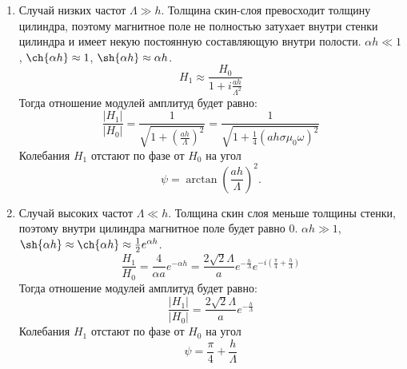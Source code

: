 \begin{enumerate}
	\item Случай низких частот $\Lambda \gg h$. Толщина скин-слоя превосходит толщину цилиндра, поэтому магнитное поле не полностью затухает внутри стенки цилиндра и имеет некую постоянную составляющую внутри полости. $\alpha h \ll 1$, $\ch{\alpha h} \approx 1$, $\sh{\alpha h} \approx \alpha h$.
	$$
	H_1 \approx \frac{H_0}{1 + i \frac{ah}{\Lambda^2}}
	$$
	Тогда отношение модулей амплитуд будет равно:
	\begin{equation}
		\frac{|H_1|}{|H_0|} = \frac{1}{\sqrt{1 + \left( \frac{ah}{\Lambda} \right)^2}} = \frac{1}{\sqrt{1 + \frac{1}{4} \left( a h \sigma \mu_0 \omega \right)^2}}
		\label{eq:low_ampl}
	\end{equation}
	Колебания $H_1$ отстают по фазе от $H_0$ на угол 
	\begin{equation}
		\psi = \arctan \left( \frac{ah}{\Lambda} \right)^2.
		\label{eq:low_phase}
	\end{equation}

	\item Случай высоких частот $\Lambda \ll h$. Толщина скин слоя меньше толщины стенки, поэтому внутри цилиндра магнитное поле будет равно 0. $\alpha h \gg 1$, $\sh{\alpha h} \approx \ch{\alpha h} \approx \frac{1}{2} e^{\alpha h}$.
	$$
	\frac{H_1}{H_0} = \frac{4}{\alpha a} e^{- \alpha h} = \frac{2\sqrt{2}\Lambda}{a} e^{-\frac{h}{\Lambda}} e^{-i \left( \frac{\pi}{4} + \frac{h}{\Lambda}\right)}
	$$
	Тогда отношение модулей амплитуд будет равно:
	\begin{equation}
		\frac{|H_1|}{|H_0|} = \frac{2\sqrt{2}\Lambda}{a} e^{-\frac{h}{\Lambda}}
		\label{eq:high_ampl}
	\end{equation}
	Колебания $H_1$ отстают по фазе от $H_0$ на угол 
	\begin{equation}
		\psi = \frac{\pi}{4} + \frac{h}{\Lambda}
		\label{eq:high_phase}
	\end{equation}
\end{enumerate}

